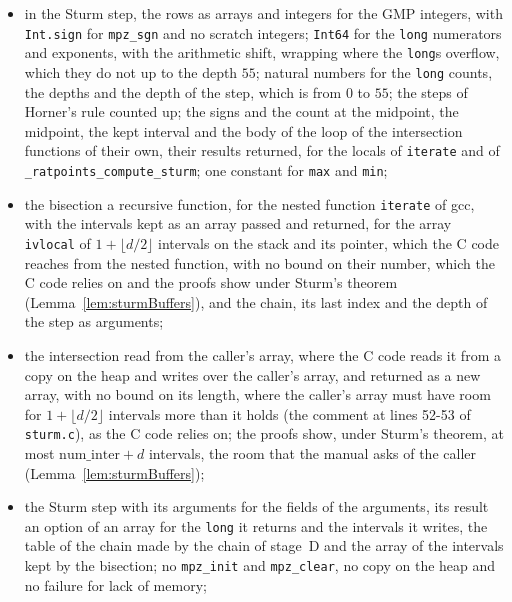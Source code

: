 \begin{itemize}
    fields of the arguments and the local flag of \verb|find_points_work_1|; the test of the
    \verb|long|s, which the C code makes between the reversal check and the search intervals
    (\verb|find_points.c| lines 4814-4823), made by the search, where it is used;
  \item in the Sturm step, the rows as arrays and integers for the GMP integers, with
    \verb|Int.sign| for \verb|mpz_sgn| and no scratch integers; \verb|Int64| for the \verb|long|
    numerators and exponents, with the arithmetic shift, wrapping where the \verb|long|s overflow,
    which they do not up to the depth $55$; natural numbers for the \verb|long| counts, the depths
    and the depth of the step, which is from $0$ to $55$; the steps of Horner's rule counted up; the
    signs and the count at the midpoint, the midpoint, the kept interval and the body of the loop of
    the intersection functions of their own, their results returned, for the locals of
    \verb|iterate| and of \verb|_ratpoints_compute_sturm|; one constant for \verb|max| and
    \verb|min|;
  \item the bisection a recursive function, for the nested function \verb|iterate| of gcc, with the
    intervals kept as an array passed and returned, for the array \verb|ivlocal| of
    $1 + \lfloor d/2 \rfloor$ intervals on the stack and its pointer, which the C code reaches from
    the nested function, with no bound on their number, which the C code relies on and the proofs
    show under Sturm's theorem (Lemma~\ref{lem:sturmBuffers}), and the chain, its last index and the
    depth of the step as arguments;
  \item the intersection read from the caller's array, where the C code reads it from a copy on the
    heap and writes over the caller's array, and returned as a new array, with no bound on its
    length, where the caller's array must have room for $1 + \lfloor d/2 \rfloor$ intervals more
    than it holds (the comment at lines 52-53 of \verb|sturm.c|), as the C code relies on; the
    proofs show, under Sturm's theorem, at most $\mathrm{num\_inter} + d$ intervals, the room that
    the manual asks of the caller (Lemma~\ref{lem:sturmBuffers});
  \item the Sturm step with its arguments for the fields of the arguments, its result an option of
    an array for the \verb|long| it returns and the intervals it writes, the table of the chain made
    by the chain of stage~D and the array of the intervals kept by the bisection; no \verb|mpz_init|
    and \verb|mpz_clear|, no copy on the heap and no failure for lack of memory;

\end{itemize}
